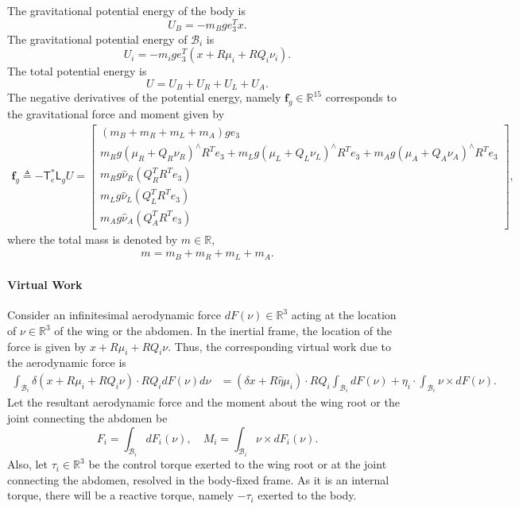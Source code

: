 \documentclass[10pt]{article}
\newcommand{\T}{\ensuremath{\mathsf{T}}}
\renewcommand{\L}{\ensuremath{\mathsf{L}}}
\renewcommand{\Re}{\ensuremath{\mathbb{R}}}
\begin{document}
The gravitational potential energy of the body is 
\[
    U_B = -m_B g e_3^T x.
\]
The gravitational potential energy of $\mathcal{B}_i$ is
\[
    U_i = -m_ig e_3^T (x + R\mu_i + RQ_i \nu_i).
\]
The total potential energy is
\[
    U = U_B + U_R + U_L + U_A.
\]
The negative derivatives of the potential energy, namely $\mathbf{f}_g\in\Re^{15}$ corresponds to the gravitational force and moment given by
\begin{align}
    \mathbf{f}_g \triangleq - \T^*_e\L_g U = \begin{bmatrix}
     (m_B+m_R+m_L+ m_A )g e_3\\
    m_Rg (\mu_R + Q_R \nu_R)^\wedge {R^T e_3}  + m_L g (\mu_L + Q_L \nu_L)^\wedge {R^T e_3}  + m_A g (\mu_A + Q_A \nu_A)^\wedge {R^T e_3}  \\
    m_R g \hat\nu_R (Q_R^T R^T e_3) \\
    m_L g \hat\nu_L (Q_L^T R^T e_3) \\
    m_A g \hat\nu_A (Q_A^T R^T e_3) 
\end{bmatrix},
\end{align}
where the total mass is denoted by $m\in\Re$,
\begin{align}
    m = m_B + m_R + m_L + m_A.
\end{align}
\nomenclature{$m\in\Re$}{total mass, i.e., $m = m_B + m_R + m_L + m_A.$}


\paragraph{Virtual Work}

Consider an infinitesimal aerodynamic force $dF(\nu)\in\Re^3$ acting at the location of $\nu\in\Re^3$ of the wing or the abdomen. 
In the inertial frame, the location of the force is given by $x+ R\mu_i + R Q_i\nu$. 
Thus, the corresponding virtual work due to the aerodynamic force is
\begin{align*}
    \int_{\mathcal{B}_i} \delta(x + R\mu_i + R Q_i\nu) \cdot R Q_i dF(\nu) d\nu
                      & =  (\delta x + R\hat\eta \mu_i) \cdot R Q_i \int_{\mathcal{B}_i} dF(\nu) + \eta_i \cdot \int_{\mathcal{B}_i} \nu \times dF(\nu).
\end{align*}
Let the resultant aerodynamic force and the moment about the wing root or the joint connecting the abdomen be
\[
    F_i = \int_{\mathcal{B}_i} dF_i(\nu) ,\quad M_i = \int_{\mathcal{B}_i} \nu\times dF_i(\nu).
\]
Also, let $\tau_i\in\Re^3$ be the control torque exerted to the wing root or at the joint connecting the abdomen, resolved in the body-fixed frame. 
As it is an internal torque, there will be a reactive torque, namely $-\tau_i$ exerted to the body. 
\end{document}
